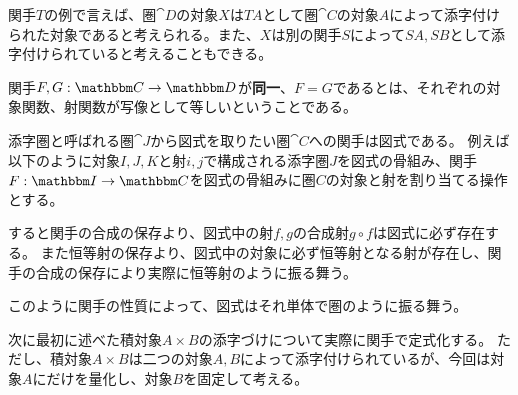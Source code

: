   関手$T$の例で言えば、圏$\cat{D}$の対象$X$は$TA$として圏$\cat{C}$の対象$A$によって添字付けられた対象であると考えられる。また、$X$は別の関手$S$によって$SA,SB$として添字付けられていると考えることもできる。

	\begin{define}[関手の同一性]\label{def-equality-of-functors}
		関手$\functor{F,G}{C}{D}$が\textbf{同一}、$F=G$であるとは、それぞれの対象関数、射関数が写像として等しいということである。
	\end{define}


	\begin{prop}[図式の圏論的な定義]\label{prop-def-diagram-by-category}
		添字圏と呼ばれる圏$\cat{J}$から図式を取りたい圏$\cat{C}$への関手は図式である。
		例えば以下のように対象$I,J,K$と射$i,j$で構成される添字圏$J$を図式の骨組み、関手$\functor{F}{I}{C}$を図式の骨組みに圏$C$の対象と射を割り当てる操作とする。

		すると関手の合成の保存より、図式中の射$f,g$の合成射$g\circ f$は図式に必ず存在する。
    また恒等射の保存より、図式中の対象に必ず恒等射となる射が存在し、関手の合成の保存により実際に恒等射のように振る舞う。

    このように関手の性質によって、図式はそれ単体で圏のように振る舞う。
		\begin{center}
		\end{center}
	\end{prop}
  次に最初に述べた積対象$A\times B$の添字づけについて実際に関手で定式化する。
  ただし、積対象$A\times B$は二つの対象$A,B$によって添字付けられているが、今回は対象$A$にだけを量化し、対象$B$を固定して考える。
